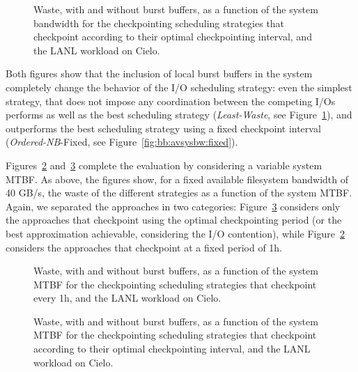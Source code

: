\documentclass[two]{article}
\newcommand{\fifononblock}{\emph{Ordered-NB}\xspace}
\newcommand{\leastwaste}{\emph{Least-Waste}\xspace}
\def\fifofixed{\fifononblock-Fixed\xspace}
\def\cooperative{\leastwaste}
\begin{document}
\begin{figure}
  \begin{center}
    \resizebox{1.05\linewidth}{!}{}
  \end{center}
  \caption{Waste, with and without burst buffers, as a function of the system bandwidth for the
    checkpointing scheduling strategies 
    that checkpoint according to their optimal checkpointing interval,
    and the LANL workload on Cielo. \label{fig:bb:avsysbw:daly}}
\end{figure}

Both figures show that the inclusion of local burst buffers in the system
completely change the behavior of the I/O scheduling strategy: even
the simplest strategy, that does not impose any coordination between
the competing I/Os performs as well as the best scheduling strategy
(\cooperative, see Figure~\ref{fig:bb:avsysbw:daly}), and outperforms
the best scheduling strategy using a fixed checkpoint interval
(\fifofixed, see Figure~\ref{fig:bb:avsysbw:fixed}).

Figures~\ref{fig:bb:mtbf:fixed} and~\ref{fig:bb:mtbf:daly} complete
the evaluation by considering a variable system MTBF. As above,
the figures show, for a fixed available filesystem bandwidth of 40
GB/s, the waste of the different strategies as a function of the
system MTBF. Again, we separated the approaches in two categories:
Figure~\ref{fig:bb:mtbf:daly} considers only the approaches that
checkpoint using the optimal checkpointing period (or the best
approximation achievable, considering the I/O contention), while
Figure~\ref{fig:bb:mtbf:fixed} considers the approaches that
checkpoint at a fixed period of 1h.

\begin{figure}
  \begin{center}
    \resizebox{1.05\linewidth}{!}{}
  \end{center}
  \caption{Waste, with and without burst buffers, as a function of the system MTBF for the
    checkpointing scheduling strategies 
    that checkpoint every 1h, and the LANL workload on
    Cielo.\label{fig:bb:mtbf:fixed}}
\end{figure}

\begin{figure}
  \begin{center}
    \resizebox{1.05\linewidth}{!}{}
  \end{center}
  \caption{Waste, with and without burst buffers, as a function of the system MTBF for the
    checkpointing scheduling strategies 
    that checkpoint according to their optimal checkpointing interval,
    and the LANL workload on Cielo. \label{fig:bb:mtbf:daly}}
\end{figure}
\end{document}
